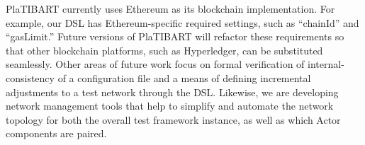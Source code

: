 PlaTIBART currently  uses Ethereum as its blockchain implementation. For example, our DSL has Ethereum-specific required settings, such as ``chainId'' and ``gasLimit.'' Future versions of PlaTIBART will refactor these requirements so that other blockchain platforms, such as Hyperledger, can be substituted seamlessly.  Other areas of future work focus on formal verification of internal-consistency of a configuration file and a means of defining incremental adjustments to a test network through the DSL. Likewise, we are developing network management tools that help to simplify and automate the network topology for both the overall test framework instance, as well as which Actor components are paired.



 





